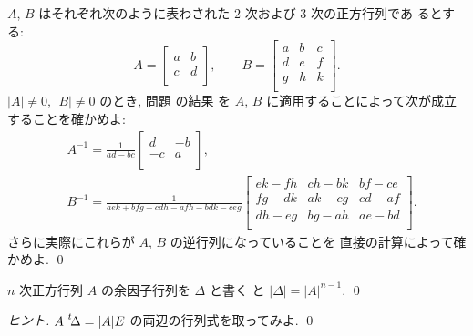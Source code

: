 \documentclass[12pt,twoside]{jarticle}
\begin{document}

\begin{question}
  $A$, $B$ はそれぞれ次のように表わされた $2$ 次および $3$ 次の正方行列であ
  るとする:
  \begin{equation*}
    A =
    \begin{bmatrix}
      a & b \\
      c & d \\
    \end{bmatrix},
    \qquad
    B =
    \begin{bmatrix}
      a & b & c \\
      d & e & f \\
      g & h & k \\
    \end{bmatrix}.
  \end{equation*}
  $|A|\ne 0$, $|B|\ne 0$ のとき, 問題  の結果
  を $A$, $B$ に適用することによって次が成立することを確かめよ:
  \begin{align*}
    &
    A^{-1} = \frac{1}{ad-bc}
    \begin{bmatrix}
       d & -b \\
      -c &  a \\
    \end{bmatrix},
    \\ &
    B^{-1} = \frac{1}{aek+bfg+cdh-afh-bdk-ceg}
    \begin{bmatrix}
      ek-fh & ch-bk & bf-ce \\
      fg-dk & ak-cg & cd-af \\
      dh-eg & bg-ah & ae-bd \\
    \end{bmatrix}.
  \end{align*}
  さらに実際にこれらが $A$, $B$ の逆行列になっていることを
  直接の計算によって確かめよ. \qed
\end{question}


\begin{question}
  $n$ 次正方行列 $A$ の余因子行列を $\Delta$ と書く
  と $|\Delta|=|A|^{n-1}$. \qed
\end{question}

\begin{proof}[ヒント]
  $A\,\tp{\!\Delta}=|A|E$ の両辺の行列式を取ってみよ.
  \qed
\end{proof}
\end{document}
